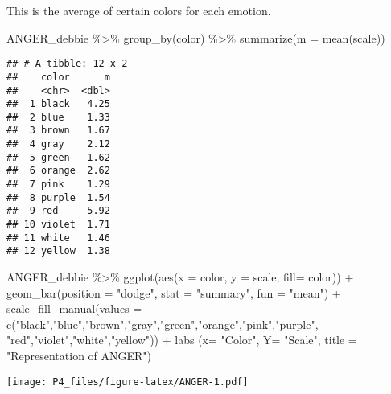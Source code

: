 \documentclass[
]{article}
\newenvironment{Shaded}{\begin{snugshade}}{\end{snugshade}}
\newcommand{\AttributeTok}[1]{\textcolor[rgb]{0.77,0.63,0.00}{#1}}
\newcommand{\FunctionTok}[1]{\textcolor[rgb]{0.00,0.00,0.00}{#1}}
\newcommand{\NormalTok}[1]{#1}
\newcommand{\SpecialCharTok}[1]{\textcolor[rgb]{0.00,0.00,0.00}{#1}}
\newcommand{\StringTok}[1]{\textcolor[rgb]{0.31,0.60,0.02}{#1}}
\begin{document}
This is the average of certain colors for each emotion.

\begin{Shaded}
\begin{Highlighting}[]
\NormalTok{ANGER\_debbie }\SpecialCharTok{\%\textgreater{}\%}
  \FunctionTok{group\_by}\NormalTok{(color) }\SpecialCharTok{\%\textgreater{}\%} 
  \FunctionTok{summarize}\NormalTok{(}\AttributeTok{m =} \FunctionTok{mean}\NormalTok{(scale))}
\end{Highlighting}
\end{Shaded}

\begin{verbatim}
## # A tibble: 12 x 2
##    color      m
##    <chr>  <dbl>
##  1 black   4.25
##  2 blue    1.33
##  3 brown   1.67
##  4 gray    2.12
##  5 green   1.62
##  6 orange  2.62
##  7 pink    1.29
##  8 purple  1.54
##  9 red     5.92
## 10 violet  1.71
## 11 white   1.46
## 12 yellow  1.38
\end{verbatim}

\begin{Shaded}
\begin{Highlighting}[]
\NormalTok{ANGER\_debbie }\SpecialCharTok{\%\textgreater{}\%}
  \FunctionTok{ggplot}\NormalTok{(}\FunctionTok{aes}\NormalTok{(}\AttributeTok{x =}\NormalTok{ color, }\AttributeTok{y =}\NormalTok{ scale, }\AttributeTok{fill=}\NormalTok{ color)) }\SpecialCharTok{+}
  \FunctionTok{geom\_bar}\NormalTok{(}\AttributeTok{position =} \StringTok{"dodge"}\NormalTok{, }\AttributeTok{stat =} \StringTok{"summary"}\NormalTok{, }\AttributeTok{fun =} \StringTok{"mean"}\NormalTok{) }\SpecialCharTok{+} \FunctionTok{scale\_fill\_manual}\NormalTok{(}\AttributeTok{values =} \FunctionTok{c}\NormalTok{(}\StringTok{"black"}\NormalTok{,}\StringTok{"blue"}\NormalTok{,}\StringTok{"brown"}\NormalTok{,}\StringTok{"gray"}\NormalTok{,}\StringTok{"green"}\NormalTok{,}\StringTok{"orange"}\NormalTok{,}\StringTok{"pink"}\NormalTok{,}\StringTok{"purple"}\NormalTok{, }\StringTok{"red"}\NormalTok{,}\StringTok{"violet"}\NormalTok{,}\StringTok{"white"}\NormalTok{,}\StringTok{"yellow"}\NormalTok{)) }\SpecialCharTok{+} \FunctionTok{labs}\NormalTok{ (}\AttributeTok{x=} \StringTok{"Color"}\NormalTok{, }\AttributeTok{Y=} \StringTok{"Scale"}\NormalTok{, }\AttributeTok{title =} \StringTok{"Representation of ANGER"}\NormalTok{)}
\end{Highlighting}
\end{Shaded}

\texttt{[image: P4\_files/figure-latex/ANGER-1.pdf]}
\end{document}
